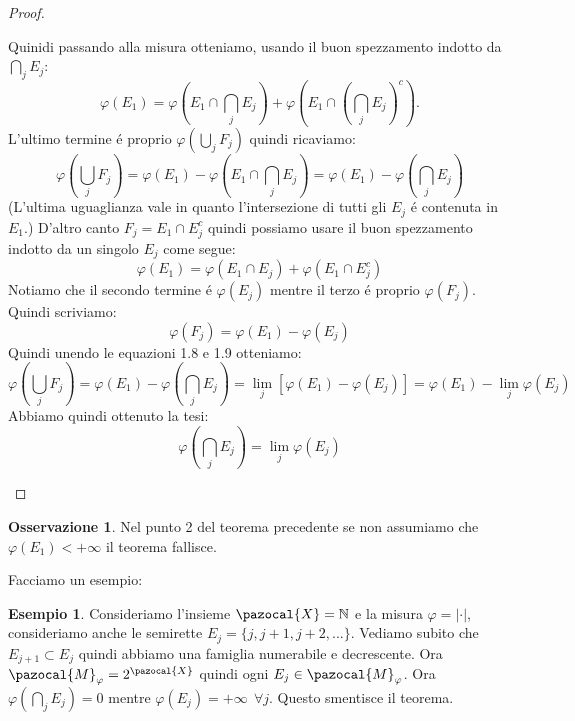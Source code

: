 \documentclass[11pt,a4paper]{report}
\theoremstyle{plain}
\theoremstyle{definition}
\newtheorem{exmp}[thm]{Esempio} %
\newtheorem{oss}[thm]{Osservazione} %
\newcommand{\M}{\pazocal{M}_\varphi}
\newcommand{\X}{\pazocal{X}}
\begin{document}
\begin{proof}
\begin{enumerate}
		 Quinidi passando alla misura otteniamo, usando il buon spezzamento indotto da $\bigcap\limits_jE_j$:
		 \[
		 	\varphi(E_1) = \varphi(E_1 \cap \bigcap\limits_jE_j) + \varphi(E_1 \cap (\bigcap\limits_jE_j)^c).
		 \]
		 L'ultimo termine \'e proprio $\varphi(\bigcup\limits_jF_j)$ quindi ricaviamo:
		 \begin{equation}
			\varphi(\bigcup\limits_jF_j) = \varphi(E_1) - \varphi(E_1 \cap \bigcap\limits_jE_j) = \varphi(E_1) - \varphi(\bigcap\limits_jE_j)
		 \end{equation}
		 (L'ultima uguaglianza vale in quanto l'intersezione di tutti gli $E_j$ \'e contenuta in $E_1$.)
		 D'altro canto $F_j = E_1 \cap E_j^c$ quindi possiamo usare il buon spezzamento indotto da un singolo $E_j$ come segue:
		 \[
			\varphi(E_1) = \varphi(E_1\cap E_j) + \varphi(E_1\cap E_j^c)
		 \]
		 Notiamo che il secondo termine \'e $\varphi(E_j)$ mentre il terzo \'e proprio $\varphi(F_j)$. Quindi scriviamo:
		 \begin{equation}
			\varphi(F_j) = \varphi(E_1) - \varphi(E_j)
		 \end{equation}
		 Quindi unendo le equazioni 1.8 e 1.9 otteniamo:
		 \[
			\varphi(\bigcup\limits_jF_j) = \varphi(E_1) - \varphi(\bigcap\limits_jE_j) = \lim\limits_j[\varphi(E_1) - \varphi(E_j)] = \varphi(E_1) - \lim\limits_j\varphi(E_j)
		 \]
		 Abbiamo quindi ottenuto la tesi:
		 \[
			\varphi(\bigcap\limits_jE_j) = \lim\limits_j\varphi(E_j)
		 \]
	\end{enumerate}
\end{proof}

\begin{oss}
	Nel punto 2 del teorema precedente se non assumiamo che $\varphi(E_1) < +\infty$ il teorema fallisce.
\end{oss}
Facciamo un esempio:
\begin{exmp}
Consideriamo l'insieme $\X = \mathbb{N}$ e la misura $\varphi = |\cdot|$, consideriamo anche le semirette $E_j = \{j,j+1,j+2, ... \}$. Vediamo subito che $E_{j+1} \subset E_j$ quindi abbiamo una famiglia numerabile e decrescente. Ora $\M = 2^\X$ quindi ogni $E_j \in \M$. Ora $\varphi(\bigcap\limits_jE_j) = 0$ mentre $\varphi(E_j) = +\infty\ \ \forall j$. Questo smentisce il teorema.
\end{exmp}
\end{document}
